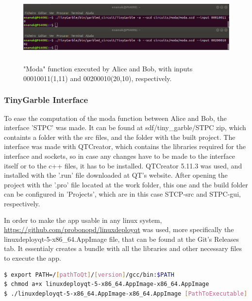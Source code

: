 \begin{refsection}
\begin{figure}[H]
	\centering
	\includegraphics[width=1\textwidth, height=3.8cm]{./sdf/tiny_garble/figures/tinygarble_moda_2.png}
    \caption{"Moda" function executed by Alice and Bob, with inputs 00010011(1,11) and 00200010(20,10), respectively.}\label{fig:tinygarble_moda_2}
\end{figure}

\newpage
\subsubsection{TinyGarble Interface}

To ease the computation of the moda function between Alice and Bob, the interface 'STPC' was made. It can be found at sdf/tiny\_garble/STPC zip, which containts a folder with the src files, and the folder with the built project. The interface was made with QTCreator, which contains the libraries required for the interface and sockets, so in case any changes have to be made to the interface itself or to the c++ files, it has to be installed. QTCreator 5.11.3 was used, and installed with the '.run' file downloaded at QT's website.
After opening the project with the '.pro' file located at the work folder, this one and the build folder can be configured in 'Projects', which are in this case STCP-src and STPC-gui, respectively.

In order to make the app usable in any linux system, \url{https://github.com/probonopd/linuxdeployqt} was used, more specifically the linuxdeployqt-5-x86\_64.AppImage file, that can be found at the Git's Releases tab. It essentialy creates a bundle with all the libraries and other necessary files to execute the app.

\begin{lstlisting}[caption={Deploying QT application. Executable in this case is at STPC-gui/STPC}, language=bash, captionpos=b]
$ export PATH=/[pathToQt]/[version]/gcc/bin:$PATH
$ chmod a+x linuxdeployqt-5-x86_64.AppImage-x86_64.AppImage
$ ./linuxdeployqt-5-x86_64.AppImage-x86_64.AppImage [PathToExecutable]
\end{lstlisting}


\end{refsection}
